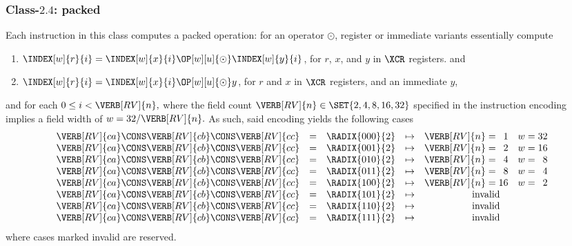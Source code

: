 
\subsubsection{Class-$2.4$: packed}
\label{sec:spec:instruction:2:4}

Each instruction in this class computes a packed operation: for an operator
$\odot$, register or immediate variants essentially compute

\begin{enumerate}
\item $\INDEX[w]{r}{i} = \INDEX[w]{x}{i} \OP[w][u]{\odot} \INDEX[w]{y}{i}$,
      for $r$, $x$, and $y$ in $\XCR$ registers.
      and
\item $\INDEX[w]{r}{i} = \INDEX[w]{x}{i} \OP[w][u]{\odot}           y    $,
      for $r$       and $x$ in $\XCR$ registers, and an immediate $y$,
\end{enumerate}

\noindent
and for each 
$
0 \leq i < \VERB[RV]{n} ,
$ 
where the field count
$
\VERB[RV]{n} \in \SET{ 2, 4, 8, 16, 32 }
$ 
specified in the instruction encoding implies a field width of 
$
w = 32 / \VERB[RV]{n} .
$
As such, said encoding yields the following cases
\[
\begin{array}{ccrcc@{\;}c@{\;}rc@{\;}c@{\;}r}
\VERB[RV]{ca} \CONS \VERB[RV]{cb} \CONS \VERB[RV]{cc} &=& \RADIX{000}{2} &\mapsto& \VERB[RV]{n} &=&  1 & w &=& 32     \\
\VERB[RV]{ca} \CONS \VERB[RV]{cb} \CONS \VERB[RV]{cc} &=& \RADIX{001}{2} &\mapsto& \VERB[RV]{n} &=&  2 & w &=& 16     \\
\VERB[RV]{ca} \CONS \VERB[RV]{cb} \CONS \VERB[RV]{cc} &=& \RADIX{010}{2} &\mapsto& \VERB[RV]{n} &=&  4 & w &=&  8     \\
\VERB[RV]{ca} \CONS \VERB[RV]{cb} \CONS \VERB[RV]{cc} &=& \RADIX{011}{2} &\mapsto& \VERB[RV]{n} &=&  8 & w &=&  4     \\
\VERB[RV]{ca} \CONS \VERB[RV]{cb} \CONS \VERB[RV]{cc} &=& \RADIX{100}{2} &\mapsto& \VERB[RV]{n} &=& 16 & w &=&  2     \\
\VERB[RV]{ca} \CONS \VERB[RV]{cb} \CONS \VERB[RV]{cc} &=& \RADIX{101}{2} &\mapsto& \multicolumn{6}{c}{\mbox{invalid}} \\
\VERB[RV]{ca} \CONS \VERB[RV]{cb} \CONS \VERB[RV]{cc} &=& \RADIX{110}{2} &\mapsto& \multicolumn{6}{c}{\mbox{invalid}} \\
\VERB[RV]{ca} \CONS \VERB[RV]{cb} \CONS \VERB[RV]{cc} &=& \RADIX{111}{2} &\mapsto& \multicolumn{6}{c}{\mbox{invalid}} \\
\end{array}
\]
where cases marked invalid are reserved.


